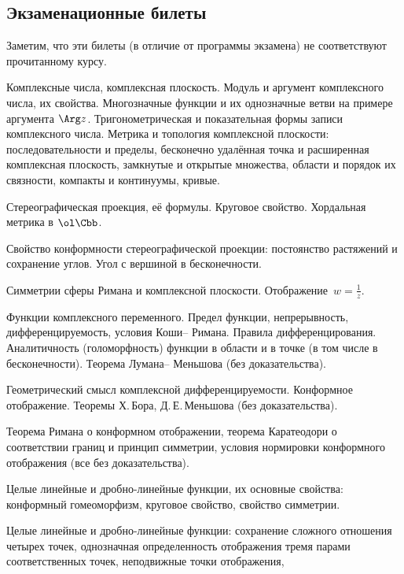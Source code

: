 \documentclass[a4paper]{article}
\begin{document}
\subsection*{Экзаменационные билеты}

\centerline{\footnotesize Заметим, что эти билеты (в отличие от программы экзамена) не соответствуют прочитанному курсу.}

\medskip

\begin{nums}{-2}
\item Комплексные числа, комплексная плоскость. Модуль и аргумент комплексного числа,
      их свойства. Многозначные функции и их однозначные ветви на примере аргумента $\Arg z$.
      Тригонометрическая и показательная формы записи комплексного числа. Метрика и топология комплексной плоскости:
      последовательности и пределы, бесконечно удалённая точка и расширенная комплексная плоскость,
      замкнутые и открытые множества, области и порядок их связности, компакты и континуумы, кривые.
\item Стереографическая проекция, её формулы. Круговое свойство. Хордальная метрика в $\ol \Cbb$.
\item Свойство конформности стереографической проекции: постоянство растяжений и сохранение углов.
      Угол с вершиной в бесконечности.
\item Симметрии сферы Римана и комплексной плоскости. Отображение~${w = \frac1z}$.
\item Функции комплексного переменного. Предел функции, непрерывность, дифференцируемость, условия Коши-- Римана.
      Правила дифференцирования. Аналитичность (голоморфность)
      функции в области и в точке (в том числе в бесконечности). Теорема Лумана-- Меньшова (без доказательства).
\item Геометрический смысл комплексной дифференцируемости. Конформное отображение. Теоремы
      Х.\,Бора, Д.\,Е.\,Меньшова (без доказательства).
\item Теорема Римана о конформном отображении, теорема Каратеодори о соответствии границ и принцип симметрии,
      условия нормировки конформного отображения (все без доказательства).
\item Целые линейные и дробно-линейные функции, их основные свойства: конформный гомеоморфизм, круговое
      свойство, свойство симметрии.
\item Целые линейные и дробно-линейные функции: сохранение сложного отношения четырех точек, однозначная
      определенность отображения тремя  парами  соответственных точек, неподвижные точки отображения,

\end{nums}
\end{document}
